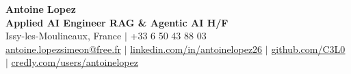 \documentclass[letterpaper,10pt]{article}
\begin{document}
\begin{center}
    {\Huge \textbf{Antoine Lopez}} \\ \vspace{2pt}
    {\large \textbf{Applied AI Engineer RAG \& Agentic AI H/F}} \\ \vspace{3pt}
    \small
    Issy-les-Moulineaux, France $|$ +33 6 50 43 88 03 \\
    \href{mailto:antoine.lopezsimeon@free.fr}{\underline{antoine.lopezsimeon@free.fr}} $|$ 
    \href{https://linkedin.com/in/antoinelopez26}{\underline{linkedin.com/in/antoinelopez26}} $|$
    \href{https://github.com/C3L0}{\underline{github.com/C3L0}} $|$
    \href{https://www.credly.com/users/antoinelopez26}{\underline{credly.com/users/antoinelopez}}
\end{center}

\vspace{-10pt}







\end{document}
